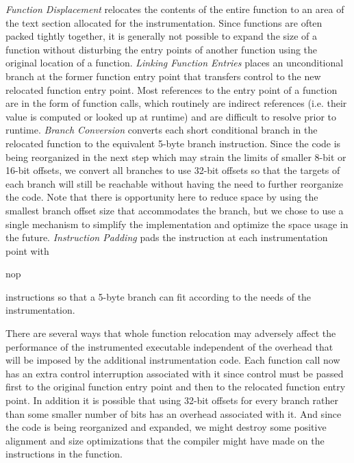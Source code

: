 \begin{figure}[ht]
{\label{Figure:funcp4}
}
\label{Figure:Relocation}
\end{figure}


\textit{Function Displacement} relocates the contents of the entire function to an area of the text section allocated
for the instrumentation. Since functions are often packed tightly together, it is generally not possible to
expand the size of a function without disturbing the entry points of another function using the original location of a function. 
\textit{Linking Function Entries} places an unconditional branch at the former function entry point that transfers control
to the new relocated function entry point. Most references to the entry point of a function are in the form of function calls, which
routinely are indirect references (i.e. their value is computed or looked up at runtime) and are difficult to resolve
prior to runtime. \textit{Branch Conversion} converts each short conditional branch in the relocated function to the equivalent
5-byte branch instruction. Since the code is being reorganized in the next step which may strain the limits of
smaller 8-bit or 16-bit offsets, we convert all branches to use 32-bit offsets so that the targets of each branch
will still be reachable without having the need to further reorganize the code. Note that there is opportunity
here to reduce space by using the smallest branch offset size that accommodates the branch, but we chose to use a single 
mechanism to simplify the implementation and optimize the space usage in the future. \textit{Instruction Padding} pads
the instruction at each instrumentation point with \begin{it}nop\end{it} instructions so that a 5-byte branch can fit
 according to the needs of the instrumentation. 

There are several ways that whole function relocation may adversely affect 
the performance of the instrumented executable independent of the overhead
that will be imposed by the additional instrumentation code. Each function call
now has an extra control interruption associated with it since control must be passed first to the original function entry
point and then to the relocated function entry point. In addition it is possible that using 32-bit offsets for every branch rather than
some smaller number of bits has an overhead associated with it. And since the code is being reorganized and expanded, 
we might destroy some positive alignment and size optimizations that the compiler might have made on the instructions in the
function.

